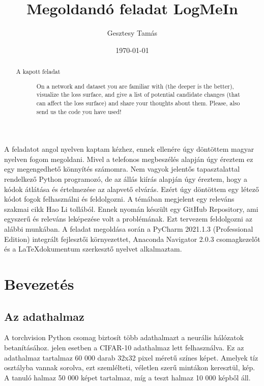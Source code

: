 \documentclass[twoside,a4paper]{refart}
\title{Megoldandó feladat LogMeIn}
\author{Gesztesy Tamás}
\date{\today}
\begin{document}
\maketitle

\begin{abstract}
	\begin{description}
		\item[A kapott feladat] On a network and dataset you are familiar with (the deeper is the better), visualize the loss surface, and give a list of potential candidate changes (that can affect the loss surface) and share your thoughts about them. Please, also send us the code you have used!
	\end{description}
\end{abstract}


A feladatot angol nyelven kaptam kézhez, ennek ellenére úgy döntöttem magyar nyelven fogom megoldani. Mivel a telefonos megbeszélés alapján úgy éreztem ez egy megengedhető könnyítés számomra. Nem vagyok jelentős tapasztalattal rendelkező Python programozó, de az állás kiírás alapján úgy éreztem, hogy a kódok átlátása és értelmezése az alapvető elvárás. Ezért úgy döntöttem egy létező kódot fogok felhasználni és feldolgozni. A témában megjelent egy releváns szakmai cikk Hao Li tollából.\cite{li2018visualizing} Ennek nyomán készült egy GitHub Repository\cite{VtLLoNN2020}, ami egyszerű és releváns leképezése volt a problémának. Ezt tervezem feldolgozni az alábbi munkában. A feladat megoldása során a PyCharm 2021.1.3 (Professional Edition) integrált fejlesztői környezettet, Anaconda Navigator 2.0.3 csomagkezelőt és a \LaTeX dokumentum szerkesztő nyelvet alkalmaztam.

\newpage

\tableofcontents

\newpage



\section{Bevezetés}

\subsection{Az adathalmaz}
\label{adathalmaz}

A torchvision Python csomag biztosít több adathalmazt a neurális hálózatok betanításához. jelen esetben a CIFAR-10\cite{CIFAR10} adathalmaz lett felhasználva. Ez az adathalmaz tartalmaz 60 000 darab 32x32 pixel méretű színes képet. Amelyek tíz osztályba vannak sorolva, ezt szemlélteti, véletlen szerű mintákon keresztül,  kép. A tanuló halmaz 50 000 képet tartalmaz, míg a teszt halmaz 10 000 képből áll. 
{\small }
\end{document}
